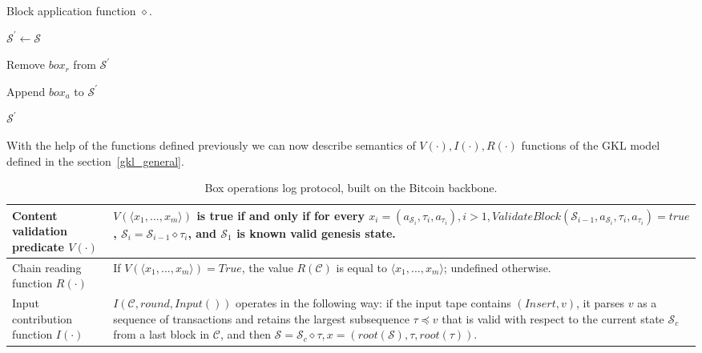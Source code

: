 \documentclass[conference,compsoc]{IEEEtran}
\begin{document}
\begin{algorithm}[H]
\caption{Block application function \(\diamond\).}
\label{algo_apply_block}
\begin{algorithmic}[1]


\State \(\mathcal{S}^{\prime} \gets \mathcal{S}\)


\State Remove \(box_r\) from \(\mathcal{S}^{\prime}\)
\EndFor

\State Append \(box_a\) to \(\mathcal{S}^{\prime}\)
\EndFor

\EndFor

\State \Return \( \mathcal{S}^{\prime} \)

\EndFunction

\end{algorithmic}
\end{algorithm}


With the help of the functions defined previously we can now describe semantics of $V(\cdot), I(\cdot), R(\cdot)$ functions of the GKL model defined in the section~\ref{gkl_general}.

\begin{table}[H]
\caption{Box operations log protocol, built on the Bitcoin backbone.}
\label{operations}
\begin{tabular}{ |l|p{10cm}| }  
  \hline
  Content validation predicate \(V(\cdot)\) & \(V (\langle x_1, ..., x_m \rangle) \) is true if and only if for every \( x_i = (a_{\mathcal{S}_i}, \tau_i, a_{\tau_i}), i > 1, ValidateBlock(\mathcal{S}_{i-1}, a_{\mathcal{S}_i}, \tau_i, a_{\tau_i}) = true \), \(\mathcal{S}_i = \mathcal{S}_{i-1} \diamond \tau_i\), and \(\mathcal{S}_1\) is known valid genesis state. \\
  \hline
  Chain reading function \(R(\cdot)\) & If \(V (\langle x_1, ..., x_m \rangle) = True \), the value \(R(\mathcal{C})\) is equal to \(\langle x_1, ..., x_m \rangle\); undefined otherwise. \\
  \hline
  Input contribution function \(I(\cdot)\) &  \(I(\mathcal{C},round,Input())\) operates in the following way: if the input tape contains \((Insert,v)\), it parses \(v\) as a sequence of transactions and retains the largest subsequence \(\tau \preceq v\) that is valid with respect to the current state \(\mathcal{S}_c\) from a last block in \(\mathcal{C}\), and then \(\mathcal{S} = \mathcal{S}_c \diamond \tau, x = (root(\mathcal{S}), \tau, root(\tau)) \). \\
  \hline
\end{tabular}
\end{table}
\end{document}
